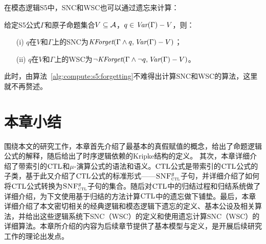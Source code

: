 在模态逻辑S5中，SNC和WSC也可以通过遗忘来计算：%
\begin{theorem}\label{thm:S5:SNC}
	给定S5公式$\Gamma$和原子命题集合$V\subseteq {\cal A}$，$q\in \textit{Var}(\Gamma) -V$，则：
	\begin{itemize}
		\item[(i)]  $q$在$V$和$\Gamma$上的SNC为$\textit{KForget}(\Gamma \wedge q, \textit{Var}(\Gamma)-V)$；
		\item[(ii)] $q$在$V$和$\Gamma$上的WSC为$\neg \textit{KForget}(\Gamma \wedge \neg q, \textit{Var}(\Gamma)-V)$。
	\end{itemize}
\end{theorem}
此时，由算法~\ref{alg:compute:s5:forgetting}不难得出计算SNC和WSC的算法，这里就不再赘述。


\section{本章小结}
围绕本文的研究工作，本章首先介绍了最基本的真假赋值的概念，给出了命题逻辑公式的解释，随后给出了时序逻辑依赖的Kripke结构的定义。
其次，本章详细介绍了带索引的$\textrm{CTL}$和$\mu$-演算公式的语法和语义。$\textrm{CTL}$公式是带索引的$\textrm{CTL}$公式的子类，基于此又介绍了$\textrm{CTL}$公式的标准形式——${\textsc{SNF}_{\textsc{ctl}}^g}$子句，并详细介绍了如何将$\textrm{CTL}$公式转换为${\textsc{SNF}_{\textsc{ctl}}^g}$子句的集合。随后对$\textrm{CTL}$中的归结过程和归结系统做了详细介绍，为下文使用基于归结的方法计算$\textrm{CTL}$中的遗忘做下铺垫。最后，本章详细介绍了本文密切相关的经典逻辑和模态逻辑下遗忘的定义、基本公设及相关算法，并给出这些逻辑系统下SNC（WSC）的定义和使用遗忘计算SNC（WSC）的详细算法。本章所介绍的内容为后续章节提供了基本模型与定义，是开展后续研究工作的理论出发点。

